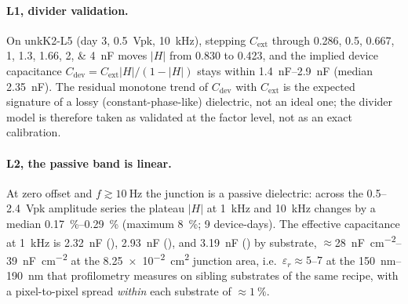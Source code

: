 \paragraph{L1, divider validation.} On unkK2-L5 (day 3, \SI{0.5}{Vpk},
\SI{10}{\kilo\hertz}), stepping \(C_\mathrm{ext}\) through
\numlist{0.286;0.5;0.667;1;1.3;1.66;2;4}~\si{\nano\farad} moves \(|H|\) from
\num{0.830} to \num{0.423}, and the implied device capacitance
\(C_\mathrm{dev} = C_\mathrm{ext}|H|/(1-|H|)\) stays within
\SIrange{1.4}{2.9}{\nano\farad} (median \SI{2.35}{\nano\farad}). The residual
monotone trend of \(C_\mathrm{dev}\) with \(C_\mathrm{ext}\) is the expected
signature of a lossy (constant-phase-like) dielectric, not an ideal one; the
divider model is therefore taken as validated at the factor level, not as an
exact calibration.

\paragraph{L2, the passive band is linear.} At zero offset and
\(f\gtrsim\SI{10}{\hertz}\) the junction is a passive dielectric:
across the \numrange{0.5}{2.4}~Vpk amplitude series the plateau \(|H|\) at
\SI{1}{\kilo\hertz} and \SI{10}{\kilo\hertz} changes by a median
\SIrange{0.17}{0.29}{\percent} (maximum \SI{8}{\percent}; \num{9}
device-days). The effective capacitance at \SI{1}{\kilo\hertz} is
\SI{2.32}{\nano\farad} (), \SI{2.93}{\nano\farad} (), and
\SI{3.19}{\nano\farad} () by substrate,
\(\approx\)\SIrange{28}{39}{\nano\farad\per\centi\meter\squared}
at the \SI{8.25e-2}{\centi\meter\squared} junction area, i.e.\
\(\varepsilon_r\approx5\)--\(7\) at the \SIrange{150}{190}{\nano\meter}
that profilometry measures on sibling substrates of the same recipe,
with a pixel-to-pixel spread \emph{within} each substrate of
\(\approx\!\SI{1}{\percent}\).

